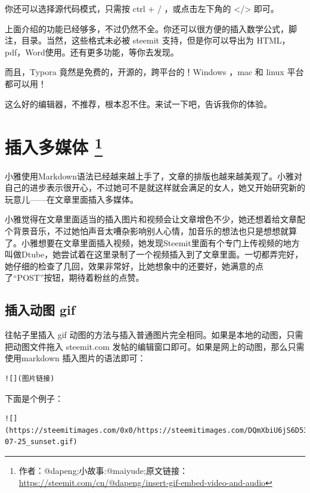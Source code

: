 \documentclass[]{ctexbook}
\begin{document}
你还可以选择源代码模式，只需按 ctrl + / ，或点击左下角的 \textless{}/\textgreater{} 即可。

上面介绍的功能已经够多，不过仍然不全。你还可以很方便的插入数学公式，脚注，目录。当然，这些格式未必被 steemit 支持，但是你可以导出为 HTML，pdf，Word使用。还有更多功能，等你去发现。

而且，Typora 竟然是免费的，开源的，跨平台的！Windows ，mac 和 linux 平台都可以用！

这么好的编辑器，不推荐，根本忍不住。来试一下吧，告诉我你的体验。

\hypertarget{crdmb}{%
\section[插入多媒体 ]{\texorpdfstring{插入多媒体 \footnote{作者：@dapeng;小故事:@maiyude;原文链接：\url{https://steemit.com/cn/@dapeng/insert-gif-embed-video-and-audio}}}{插入多媒体 }}\label{crdmb}}

小雅使用Markdown语法已经越来越上手了，文章的排版也越来越美观了。小雅对自己的进步表示很开心，不过她可不是就这样就会满足的女人，她又开始研究新的玩意儿------在文章里面插入多媒体。

小雅觉得在文章里面适当的插入图片和视频会让文章增色不少，她还想着给文章配个背景音乐，不过她怕声音太嘈杂影响别人心情，加音乐的想法也只是想想就算了。小雅想要在文章里面插入视频，她发现Steemit里面有个专门上传视频的地方叫做Dtube，她尝试着在这里录制了一个视频插入到了文章里面。一切都弄完好，她仔细的检查了几回，效果非常好，比她想象中的还要好，她满意的点了``POST''按钮，期待着粉丝的点赞。

\hypertarget{-gif}{%
\subsection{插入动图 gif}\label{-gif}}

往帖子里插入 gif 动图的方法与插入普通图片完全相同。如果是本地的动图，只需把动图文件拖入 steemit.com 发帖的编辑窗口即可。如果是网上的动图，那么只需使用markdown 插入图片的语法即可：

\begin{verbatim}
![](图片链接)
\end{verbatim}

下面是个例子：

\begin{verbatim}
![](https://steemitimages.com/0x0/https://steemitimages.com/DQmXbiU6jS6D53RA2sUDX63K2511ENqzJUe3ak81dwf3v56/2017-07-25_sunset.gif)
\end{verbatim}
\end{document}
